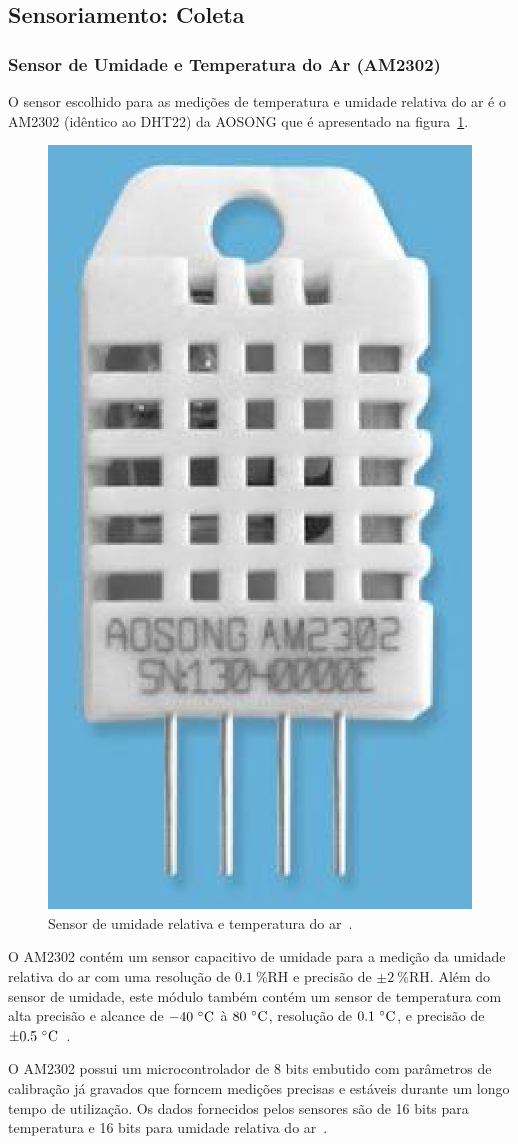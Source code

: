 \subsection{Sensoriamento: Coleta}


	\subsubsection{Sensor de Umidade e Temperatura do Ar (AM2302)}

		O sensor escolhido para as medições de temperatura e umidade relativa do ar
		é o AM2302 (idêntico ao DHT22) da AOSONG que é apresentado na figura~\ref{fig:AM2302}.

		\begin{figure}[!htbp]
		\begin{center}
		\includegraphics[width=.4\textwidth]{figuras/am2302.eps}
		\caption{\label{fig:AM2302}Sensor de umidade relativa e temperatura do ar~\cite{aosong}.}
		\end{center}
		\end{figure}

		O AM2302 contém um sensor capacitivo de umidade para a medição da umidade relativa
		do ar com uma resolução de $0.1~\%\textrm{RH}$ e precisão de $\pm 2~\%\textrm{RH}$.
		Além do sensor de umidade, este módulo também contém um sensor de temperatura com
		alta precisão e alcance de $-40~\celsius$ à $80~\celsius$, resolução de $0.1~\celsius$,
		e precisão de $\pm 0.5~\celsius$~\cite{aosong}.

		O AM2302 possui um microcontrolador de 8 bits embutido com parâmetros de calibração já gravados
		que forncem medições precisas e estáveis durante um longo tempo de utilização.
		Os dados fornecidos pelos sensores são de 16 bits para temperatura e
		16 bits para umidade relativa do ar~\cite{aosong}.

